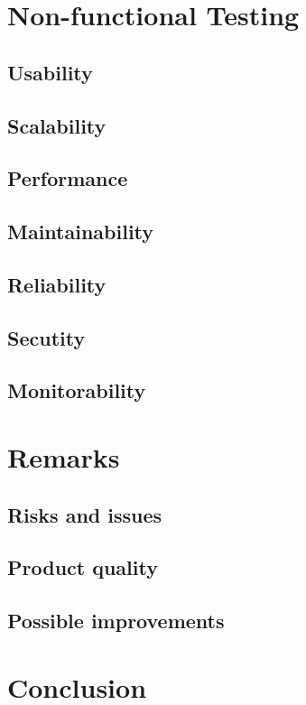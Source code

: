 \documentclass[a4paper,12pt,titlepage]{article}
\begin{document}
	
\section{Non-functional Testing}
	\subsection{Usability}
	
	\subsection{Scalability}
	
	\subsection{Performance}
	
	\subsection{Maintainability}
	
	\subsection{Reliability}
	
	\subsection{Secutity}
	
	\subsection{Monitorability}
	
\section{Remarks}
	\subsection{Risks and issues}
	
	\subsection{Product quality}
	
	\subsection{Possible improvements}

\section{Conclusion}
	
\end{document}
